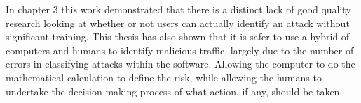 In chapter 3 this work demonstrated that there is a distinct lack of good quality research looking at whether or not users can actually identify an attack without significant training. This thesis has also shown that it is safer to use a hybrid of computers and humans to identify malicious traffic, largely due to the number of errors in classifying attacks within the software. Allowing the computer to do the mathematical calculation to define the risk, while allowing the humans to undertake the decision making process of what action, if any, should be taken.






